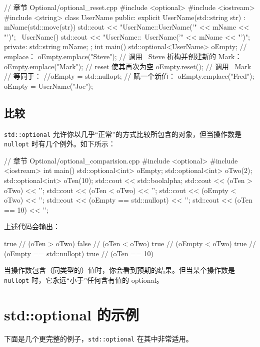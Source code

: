 \begin{codebox}[cpp]
// 章节 Optional/optional_reset.cpp
#include <optional>
#include <iostream>
#include <string>
class UserName
{
public:
explicit UserName(std::string str) : mName(std::move(str))
{
std::cout << "UserName::UserName('" << mName << "')\n";
}
~UserName()
{
std::cout << "UserName::~UserName('" << mName << "')\n";
}
private:
std::string mName;
};
int main()
{
std::optional<UserName> oEmpty;
// emplace：
oEmpty.emplace("Steve");
// 调用 ~Steve 析构并创建新的 Mark：
oEmpty.emplace("Mark");
// reset 使其再次为空
oEmpty.reset(); // 调用 ~Mark
// 等同于：
//oEmpty = std::nullopt;
// 赋一个新值：
oEmpty.emplace("Fred");
oEmpty = UserName("Joe");
}
\end{codebox}

\subsection{比较}
\texttt{std::optional} 允许你以几乎“正常”的方式比较所包含的对象，但当操作数是 \texttt{nullopt} 时有几个例外。如下所示：

\begin{codebox}[cpp]
// 章节 Optional/optional_comparision.cpp
#include <optional>
#include <iostream>
int main()
{
std::optional<int> oEmpty;
std::optional<int> oTwo(2);
std::optional<int> oTen(10);
std::cout << std::boolalpha;
std::cout << (oTen > oTwo) << '\n';
std::cout << (oTen < oTwo) << '\n';
std::cout << (oEmpty < oTwo) << '\n';
std::cout << (oEmpty == std::nullopt) << '\n';
std::cout << (oTen == 10) << '\n';
}
\end{codebox}

上述代码会输出：

\begin{codebox}[cpp]
true
// (oTen > oTwo)
false // (oTen < oTwo)
true
// (oEmpty < oTwo)
true
// (oEmpty == std::nullopt)
true
// (oTen == 10)
\end{codebox}

当操作数包含（同类型的）值时，你会看到预期的结果。但当某个操作数是 \texttt{nullopt} 时，它永远“小于”任何含有值的 optional。

\section{std::optional 的示例}
下面是几个更完整的例子，\texttt{std::optional} 在其中非常适用。

